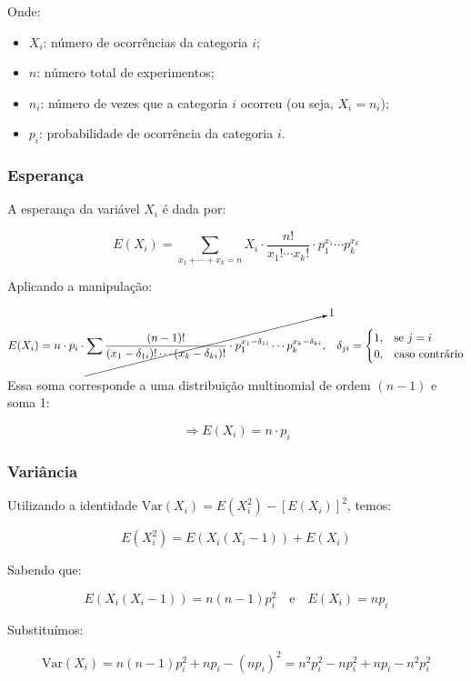 \documentclass[
]{article}
\begin{document}
Onde:

\begin{itemize}
  \item $X_i$: número de ocorrências da categoria $i$;
  \item $n$: número total de experimentos;
  \item $n_i$: número de vezes que a categoria $i$ ocorreu (ou seja, $X_i = n_i$);
  \item $p_i$: probabilidade de ocorrência da categoria $i$.
\end{itemize}

\hypertarget{esperanuxe7a-2}{%
\subsubsection{Esperança}\label{esperanuxe7a-2}}

A esperança da variável \(X_i\) é dada por:

\[
E(X_i) = \sum_{x_1 + \cdots + x_k = n} X_i \cdot \frac{n!}{x_1! \cdots x_k!} \cdot p_1^{x_1} \cdots p_k^{x_k}
\]

Aplicando a manipulação:

\[
E(X_i) = n \cdot p_i \cdot 
\cancelto{1}{
  \sum \frac{(n - 1)!}{
    (x_1 - \delta_{1i})! \cdots (x_k - \delta_{ki})!
  }
  \cdot p_1^{x_1 - \delta_{1i}} \cdots p_k^{x_k - \delta_{ki}}
}
\text{,} \quad 
\delta_{ji} =
\begin{cases}
  1, & \text{se } j = i \\
  0, & \text{caso contrário}
\end{cases}
\]

Essa soma corresponde a uma distribuição multinomial de ordem \((n - 1)\) e soma 1:

\[
\Rightarrow E(X_i) = n \cdot p_i
\]

\hypertarget{variuxe2ncia-2}{%
\subsubsection{Variância}\label{variuxe2ncia-2}}

Utilizando a identidade \(\text{Var}(X_i) = E(X_i^2) - [E(X_i)]^2\), temos:

\[
E(X_i^2) = E(X_i(X_i - 1)) + E(X_i)
\]

Sabendo que:

\[
E(X_i(X_i - 1)) = n(n - 1)p_i^2 \quad \text{e} \quad E(X_i) = np_i
\]

Substituímos:

\[
\text{Var}(X_i) = n(n - 1)p_i^2 + np_i - (np_i)^2
= n^2p_i^2 - np_i^2 + np_i - n^2p_i^2
\]
\end{document}

